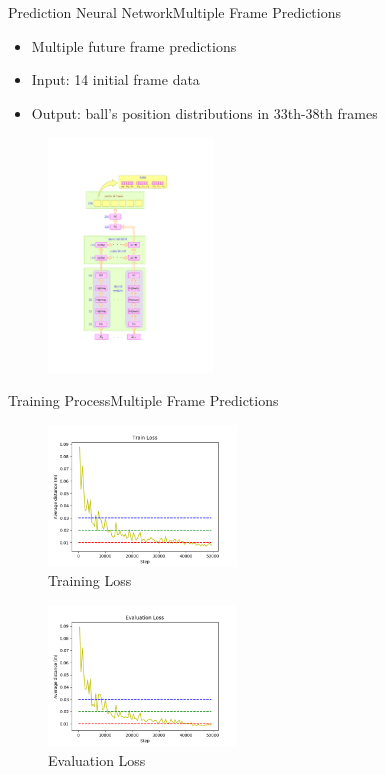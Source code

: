 \documentclass{beamer}
\begin{document}
	\begin{frame}{Prediction Neural Network}{Multiple Frame Predictions}
	\begin{minipage}{6cm}
	\begin{itemize}
	\item {{\color{magenta}Multiple} future frame predictions}
	\item {{\color{blue}Input}: 14 initial frame data }
	\item {{\color{blue}Output}: ball's position distributions in 33th-38th frames}
	\end{itemize}
	\end{minipage}
	\begin{minipage}{5cm}
	\begin{figure}
	\includegraphics[width=4.4cm]{m_nn.pdf}
	\end{figure}
	\end{minipage}
	\end{frame}
	
	\begin{frame}{Training Process}{Multiple Frame Predictions}
	\begin{minipage}{5.5cm}
	\begin{figure}
	\includegraphics[width=5cm]{m_train_loss.png}
	\caption{Training Loss}
	\end{figure}
	\end{minipage}
	\begin{minipage}{5.5cm}
	\begin{figure}
	\includegraphics[width=5cm]{m_eval_loss.png}
	\caption{Evaluation Loss}
	\end{figure}
	\end{minipage}
	\end{frame}
	
\end{document}
